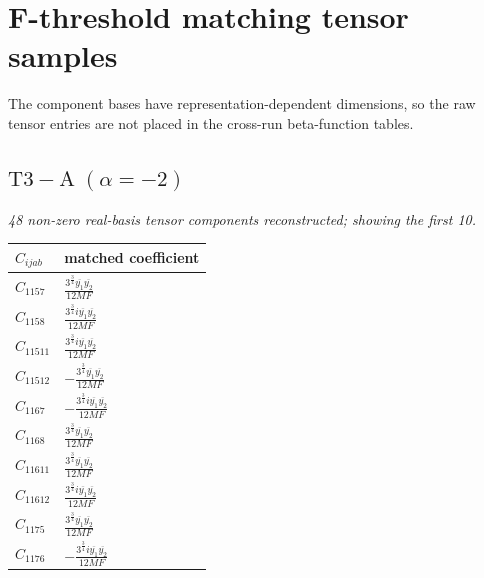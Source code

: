 \documentclass[9pt]{article}
\begin{document}
\section*{F-threshold matching tensor samples}
The component bases have representation-dependent dimensions, so the raw tensor entries are not placed in the cross-run beta-function tables.
\subsection*{$ \mathrm{T3-A}\;(\alpha=-2) $}
\textit{48 non-zero real-basis tensor components reconstructed; showing the first 10.}
\begin{longtable}{@{}ll@{}}
\toprule
$C_{ijab}$ & matched coefficient \\
\midrule
$C_{1157}$ & $ \frac{3^{\frac{3}{4}} \overline{y_{1}} \overline{y_{2}}}{12 MF} $ \\
$C_{1158}$ & $ \frac{3^{\frac{3}{4}} i \overline{y_{1}} \overline{y_{2}}}{12 MF} $ \\
$C_{11511}$ & $ \frac{3^{\frac{3}{4}} i \overline{y_{1}} \overline{y_{2}}}{12 MF} $ \\
$C_{11512}$ & $ - \frac{3^{\frac{3}{4}} \overline{y_{1}} \overline{y_{2}}}{12 MF} $ \\
$C_{1167}$ & $ - \frac{3^{\frac{3}{4}} i \overline{y_{1}} \overline{y_{2}}}{12 MF} $ \\
$C_{1168}$ & $ \frac{3^{\frac{3}{4}} \overline{y_{1}} \overline{y_{2}}}{12 MF} $ \\
$C_{11611}$ & $ \frac{3^{\frac{3}{4}} \overline{y_{1}} \overline{y_{2}}}{12 MF} $ \\
$C_{11612}$ & $ \frac{3^{\frac{3}{4}} i \overline{y_{1}} \overline{y_{2}}}{12 MF} $ \\
$C_{1175}$ & $ \frac{3^{\frac{3}{4}} \overline{y_{1}} \overline{y_{2}}}{12 MF} $ \\
$C_{1176}$ & $ - \frac{3^{\frac{3}{4}} i \overline{y_{1}} \overline{y_{2}}}{12 MF} $ \\
\bottomrule
\end{longtable}
\end{document}
